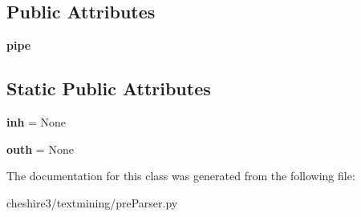 \subsection*{Public Attributes}
\begin{DoxyCompactItemize}
\item 
\hypertarget{classcheshire3_1_1textmining_1_1pre_parser_1_1_tsujii_chunker_pre_parser_a1125039d6f163e4c083269203292795c}{{\bfseries pipe}}\label{classcheshire3_1_1textmining_1_1pre_parser_1_1_tsujii_chunker_pre_parser_a1125039d6f163e4c083269203292795c}

\end{DoxyCompactItemize}
\subsection*{Static Public Attributes}
\begin{DoxyCompactItemize}
\item 
\hypertarget{classcheshire3_1_1textmining_1_1pre_parser_1_1_tsujii_chunker_pre_parser_a1108c4de6c290130d54dfc3ccb30322e}{{\bfseries inh} = None}\label{classcheshire3_1_1textmining_1_1pre_parser_1_1_tsujii_chunker_pre_parser_a1108c4de6c290130d54dfc3ccb30322e}

\item 
\hypertarget{classcheshire3_1_1textmining_1_1pre_parser_1_1_tsujii_chunker_pre_parser_a83540679456f5669f9e4cf5d510d5bda}{{\bfseries outh} = None}\label{classcheshire3_1_1textmining_1_1pre_parser_1_1_tsujii_chunker_pre_parser_a83540679456f5669f9e4cf5d510d5bda}

\end{DoxyCompactItemize}


The documentation for this class was generated from the following file\-:\begin{DoxyCompactItemize}
\item 
cheshire3/textmining/pre\-Parser.\-py\end{DoxyCompactItemize}
